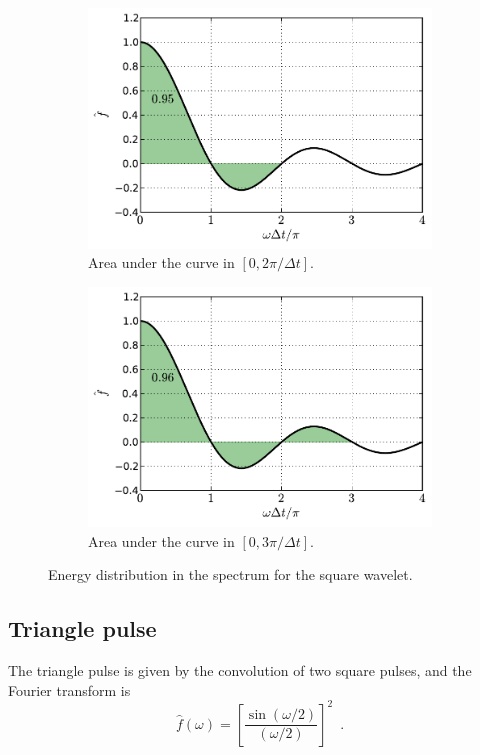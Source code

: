 \documentclass[12pt,letterpaper]{article}
\begin{document}
{\begin{figure}[H]
\begin{subfigure}[b]{0.45\textwidth}
        \includegraphics[width=\textwidth]{img/square_area=3.pdf}
        \caption{Area under the curve in $[0,2\pi/\Delta t]$.}
    \end{subfigure}
    \begin{subfigure}[b]{0.45\textwidth}
        \includegraphics[width=\textwidth]{img/square_area=4.pdf}
        \caption{Area under the curve in $[0,3\pi/\Delta t]$.}
    \end{subfigure}
    \caption{Energy distribution in the spectrum for the square wavelet.}
    \label{fig:square-areas}
\end{figure}

\subsection{Triangle pulse}
The triangle pulse is given by the convolution of two square pulses, and the Fourier transform is
\begin{equation}
\hat{f}(\omega) = \left[\frac{\sin(\omega/2)}{(\omega/2)}\right]^2 \enspace .
\end{equation}

}
\end{document}
